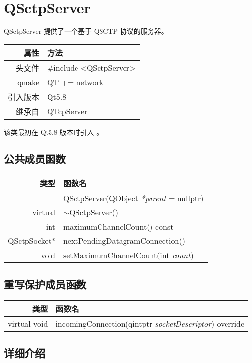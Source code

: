 \chapter{QSctpServer}

QSctpServer 提供了一个基于 QSCTP 协议的服务器。

\begin{tabular}{|r|l|}
	\hline
	属性 & 方法 \\
	\hline
	头文件 & \#include <QSctpServer>\\      
	\hline
	qmake & QT += network\\      
	\hline
	引入版本 &	Qt5.8 \\ 
	\hline
继承自	 & QTcpServer \\ 
	\hline
\end{tabular}

该类最初在 Qt5.8 版本时引入 。

\section{公共成员函数}

\begin{tabular}{|r|l|}
	\hline 
	类型	& 函数名 \\ 
	\hline
	& QSctpServer(QObject \emph{*parent} = nullptr)  \\ 
	\hline
	virtual	& $\sim$QSctpServer() \\ 
	\hline
	int	& maximumChannelCount() const  \\ 
	\hline
	QSctpSocket* &	nextPendingDatagramConnection() \\ 
	\hline
	void	& setMaximumChannelCount(int \emph{count}) \\ 
	\hline
\end{tabular}


\section{重写保护成员函数}

\begin{tabular}{|r|l|}
	\hline 
	类型	& 函数名 \\ 
	\hline
	virtual void	& incomingConnection(qintptr \emph{socketDescriptor}) override \\ 
	\hline
\end{tabular}

\section{详细介绍}

